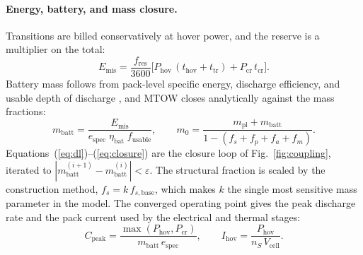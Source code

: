 \paragraph{Energy, battery, and mass closure.} Transitions are billed
conservatively at hover power, and the reserve is a multiplier on the
total:
\begin{equation}
E_{\mathrm{mis}} = \frac{f_{\mathrm{res}}}{3600}\Big[
  P_{\mathrm{hov}}\,(t_{\mathrm{hov}}+t_{\mathrm{tr}})
  + P_{\mathrm{cr}}\,t_{\mathrm{cr}}\Big].
\label{eq:energy}
\end{equation}
Battery mass follows from pack-level specific energy, discharge
efficiency, and usable depth of discharge \citep{tyan2017}, and MTOW
closes analytically against the mass fractions:
\begin{equation}
m_{\mathrm{batt}} = \frac{E_{\mathrm{mis}}}
  {e_{\mathrm{spec}}\;\eta_{\mathrm{bat}}\;f_{\mathrm{usable}}},
\qquad
m_0 = \frac{m_{\mathrm{pl}} + m_{\mathrm{batt}}}
           {1 - (f_s + f_p + f_a + f_m)} .
\label{eq:closure}
\end{equation}
Equations~(\ref{eq:dl})--(\ref{eq:closure}) are the closure loop of
Fig.~\ref{fig:coupling}, iterated to
$|m_{\mathrm{batt}}^{(i+1)}-m_{\mathrm{batt}}^{(i)}| < \varepsilon$.
The structural fraction is scaled by the construction method,
$f_s = k\,f_{s,\mathrm{base}}$, which makes $k$ the single most
sensitive mass parameter in the model. The converged operating point
gives the peak discharge rate and the pack current used by the
electrical and thermal stages:
\begin{equation}
C_{\mathrm{peak}}
  = \frac{\max(P_{\mathrm{hov}},P_{\mathrm{cr}})}
         {m_{\mathrm{batt}}\,e_{\mathrm{spec}}},
\qquad
I_{\mathrm{hov}} = \frac{P_{\mathrm{hov}}}{n_S\,V_{\mathrm{cell}}} .
\label{eq:crate}
\end{equation}

